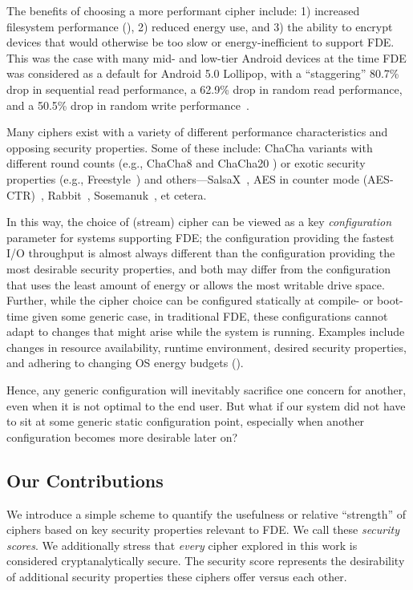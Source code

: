 The benefits of choosing a more performant cipher include: 1) increased
filesystem performance (), 2) reduced energy
use, and 3) the ability to encrypt devices that would otherwise be too slow or
energy-inefficient to support FDE. This was the case with many mid- and low-tier
Android devices at the time FDE was considered as a default for Android 5.0
Lollipop, with a ``staggering'' 80.7\% drop in sequential read performance, a
62.9\% drop in random read performance, and a 50.5\% drop in random write
performance~\cite{android-M-mobile-motivation-2}.

Many ciphers exist with a variety of different performance characteristics and
opposing security properties. Some of these include: ChaCha variants with
different round counts (e.g., ChaCha8 \cite{ChaCha8} and ChaCha20
\cite{ChaCha20}) or exotic security properties (e.g.,
Freestyle~\cite{Freestyle}) and others---SalsaX~\cite{SalsaX}, AES in counter
mode (AES-CTR)~\cite{AES-CTR}, Rabbit~\cite{Rabbit}, Sosemanuk~\cite{Sosemanuk},
et cetera.

In this way, the choice of (stream) cipher can be viewed as a key
\emph{configuration} parameter for systems supporting FDE; the configuration
providing the fastest I/O throughput is almost always different than the
configuration providing the most desirable security properties, and both may
differ from the configuration that uses the least amount of energy or allows the
most writable drive space. Further, while the cipher choice can be configured
statically at compile- or boot-time given some generic case, in traditional FDE,
these configurations cannot adapt to changes that might arise while the system
is running. Examples include changes in resource availability, runtime
environment, desired security properties, and adhering to changing OS energy
budgets ().

Hence, any generic configuration will inevitably sacrifice one concern for
another, even when it is not optimal to the end user. But what if our system did
not have to sit at some generic static configuration point, especially when
another configuration becomes more desirable later on?

\subsection{Our Contributions}

We introduce a simple scheme to quantify the usefulness or relative ``strength''
of ciphers based on key security properties relevant to FDE. We call these
\emph{security scores}. We additionally stress that \textit{every} cipher
explored in this work is considered cryptanalytically secure. The security score
represents the desirability of additional security properties these ciphers
offer versus each other.

